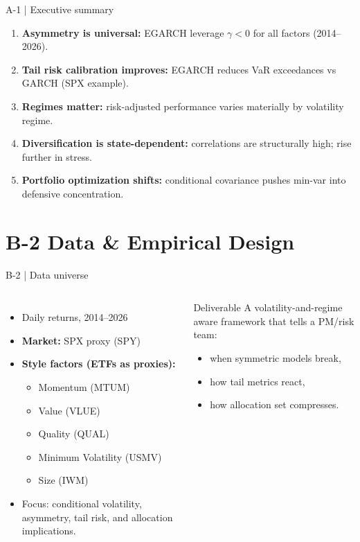 \documentclass[aspectratio=169,10pt]{beamer}
\newcommand{\kpi}[1]{\textbf{\color{blue}#1}}
\begin{document}
\begin{frame}{A-1 | Executive summary}
\small
\begin{enumerate}
  \item \kpi{Asymmetry is universal:} EGARCH leverage $\gamma < 0$ for all factors (2014--2026).
  \item \kpi{Tail risk calibration improves:} EGARCH reduces VaR exceedances vs GARCH (SPX example).
  \item \kpi{Regimes matter:} risk-adjusted performance varies materially by volatility regime.
  \item \kpi{Diversification is state-dependent:} correlations are structurally high; rise further in stress.
  \item \kpi{Portfolio optimization shifts:} conditional covariance pushes min-var into defensive concentration.
\end{enumerate}
\end{frame}

\section{B-2 Data \& Empirical Design}

\begin{frame}{B-2 | Data universe}
\small
\begin{columns}[T,onlytextwidth]
\begin{itemize}
  \item Daily returns, 2014--2026
  \item \kpi{Market:} SPX proxy (SPY)
  \item \kpi{Style factors (ETFs as proxies):}
  \begin{itemize}
    \item Momentum (MTUM)
    \item Value (VLUE)
    \item Quality (QUAL)
    \item Minimum Volatility (USMV)
    \item Size (IWM)
  \end{itemize}
  \item Focus: conditional volatility, asymmetry, tail risk, and allocation implications.
\end{itemize}

\begin{block}{Deliverable}
A volatility-and-regime aware framework that tells a PM/risk team:
\begin{itemize}
  \item when symmetric models break,
  \item how tail metrics react,
  \item how allocation set compresses.
\end{itemize}
\end{block}
\end{columns}
\end{frame}
\end{document}
